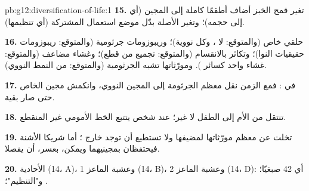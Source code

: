 \begin{solution}{pb:g12:diversification-of-life:1}
\textbf{15.} تغير قمح الخبز أضاف أطقمًا كاملة إلى المجين (أي إلى
حجمه)؛ وتغير الأصلة بدّل موضع استعمال  المشتركة (أي تنظيمها).

\textbf{16.}  حلقي خاص (والمتوقع: لا ، وكل  نووية)؛
وريبوزومات جرثومية (والمتوقع: ريبوزومات حقيقيات النوا)؛ وتكاثر
بالانقسام (والمتوقع: تجميع من قطع)؛ وغشاء مضاعف (والمتوقع: غشاء واحد
كسائر ). ومورّثاتها تشبه  الجرثومية (والمتوقع:
 من النمط النووي).

\textbf{17.} في : فمع الزمن نقل معظم  الجرثومة إلى المجين
النووي، وانكمش مجين  الخاص حتى صار بقية.

\textbf{18.}   تنتقل من الأم إلى الطفل لا غير؛ 
 عند شخص يتتبع الخط الأمومي غير المنقطع.

\textbf{19.}  تخلت عن معظم مورّثاتها لمضيفها ولا تستطيع أن
توجد خارج ؛ أما شريكا الأشنة فيحتفظان بمجينيهما ويمكن، بعسر، أن
يفصلا.

\textbf{20.} الأحادية (14، A)، وعشبة الماعز 1 (14، B)، وعشبة الماعز 2
(14، D): أي 42 صبغيًا؛ و"التنظيم"؛ .
\end{solution}
